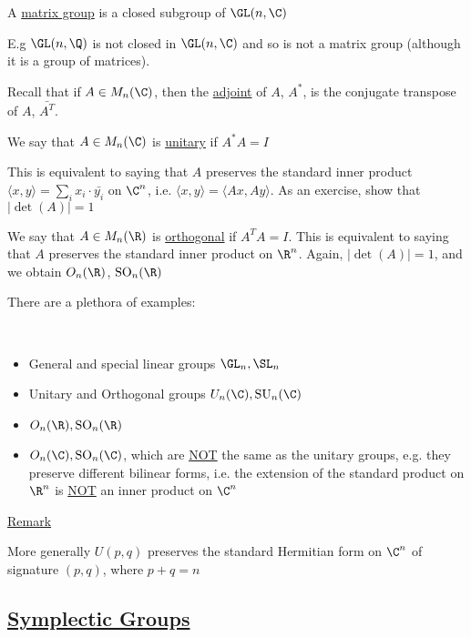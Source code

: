 \documentclass[x11names,reqno,14pt]{extarticle}
\DeclareMathOperator{\SU}{SU}
\DeclareMathOperator{\SO}{SO}
\begin{document}

A \underline{matrix group} is a closed subgroup of $\GL(n,\C)$

E.g $\GL(n,\Q)$ is not closed in $\GL(n,\C)$ and so is not a matrix group (although it is a group of matrices). 


Recall that if $A \in M_n(\C)$, then the \underline{adjoint} of $A$, $A^*$, is the conjugate transpose of $A$, $\bar{A^T}$. 

We say that $A \in M_n(\C)$ is \underline{unitary} if $A^*A = I$

This is equivalent to saying that $A$ preserves the standard inner product $\langle x, y \rangle = \sum_ix_i\cdot \bar{y_i}$ on $\C^n$, i.e. $\langle x, y \rangle = \langle A x, Ay \rangle$. As an exercise, show that $|\det(A)| = 1$

We say that $A \in M_n(\R)$ is \underline{orthogonal} if $A^TA = I$. This is equivalent to saying that $A$ preserves the standard inner product on $\R^n$. Again, $|\det(A)| = 1$, and we obtain $O_n(\R)$, $\SO_n(\R)$


There are a plethora of examples:

\exm
\,

\begin{itemize}

\item General and special linear groups $\GL_n, \SL_n$

\item Unitary and Orthogonal groups $U_n(\C), \SU_n(\C)$

\item $O_n(\R), \SO_n(\R)$

\item $O_n(\C), \SO_n(\C)$, which are \underline{NOT} the same as the unitary groups, e.g. they preserve different bilinear forms, i.e. the extension of the standard product on $\R^n$ is \underline{NOT} an inner product on $\C^n$


\end{itemize}

\underline{Remark}

More generally $U(p, q)$ preserves the standard Hermitian form on $\C^n$ of signature $(p, q)$, where $p + q = n$

\subsection*{\underline{Symplectic Groups}}
\end{document}
